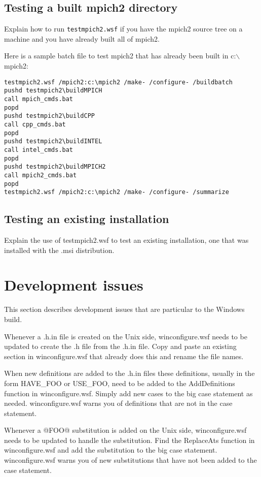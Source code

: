 \documentclass[dvipdfm,11pt]{article}
\begin{document}
\subsection{Testing a built mpich2 directory}
Explain how to run \texttt{testmpich2.wsf} if you have the mpich2 source tree on a machine and you 
have already built all of mpich2.

Here is a sample batch file to test mpich2 that has already been built in c:$\backslash$mpich2:
\begin{verbatim}
testmpich2.wsf /mpich2:c:\mpich2 /make- /configure- /buildbatch
pushd testmpich2\buildMPICH
call mpich_cmds.bat
popd
pushd testmpich2\buildCPP
call cpp_cmds.bat
popd
pushd testmpich2\buildINTEL
call intel_cmds.bat
popd
pushd testmpich2\buildMPICH2
call mpich2_cmds.bat
popd
testmpich2.wsf /mpich2:c:\mpich2 /make- /configure- /summarize
\end{verbatim}

\subsection{Testing an existing installation}
Explain the use of testmpich2.wsf to test an existing installation, one that was installed
with the .msi distribution.

\section{Development issues}
This section describes development issues that are particular to the Windows build.

Whenever a .h.in file is created on the Unix side, winconfigure.wsf needs to be updated to
create the .h file from the .h.in file.  Copy and paste an existing section in 
winconfigure.wsf that already does this and rename the file names.

When new definitions are added to the .h.in files these definitions, usually in the form HAVE\_FOO 
or USE\_FOO, need to be added to the AddDefinitions function in winconfigure.wsf.  Simply add 
new cases to the big case statement as needed.  winconfigure.wsf warns you of definitions that 
are not in the case statement.

Whenever a @FOO@ substitution is added on the Unix side, winconfigure.wsf needs to be updated
to handle the substitution.  Find the ReplaceAts function in winconfigure.wsf and add the 
substitution to the big case statement.  winconfigure.wsf warns you of new substitutions that
have not been added to the case statement.
\end{document}
